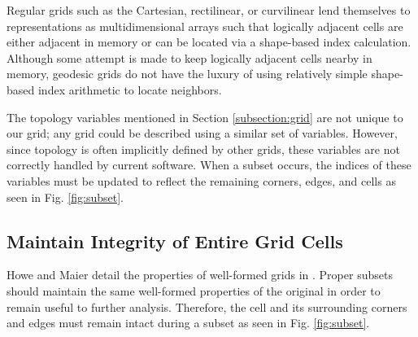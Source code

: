 Regular grids such as the Cartesian, rectilinear, or curvilinear lend
themselves to representations as multidimensional arrays such that logically
adjacent cells are either adjacent in memory or can be located via a
shape-based index calculation.  Although some attempt is made to keep
logically adjacent cells nearby in memory, geodesic grids do not have the
luxury of using relatively simple shape-based index arithmetic to locate
neighbors.

The topology variables mentioned in Section \ref{subsection:grid} are not
unique to our grid; any grid could be described using a similar set of
variables.  However, since topology is often implicitly defined by other
grids, these variables are not correctly handled by current software.  When a
subset occurs, the indices of these variables must be updated to reflect the
remaining corners, edges, and cells as seen in Fig. \ref{fig:subset}.

\subsection{Maintain Integrity of Entire Grid Cells}

Howe and Maier detail the properties of well-formed grids in \cite{UGRID}.
Proper subsets should maintain the same well-formed properties of the original
in order to remain useful to further analysis.  Therefore, the cell and its
surrounding corners and edges must remain intact during a subset as seen in
Fig. \ref{fig:subset}.
